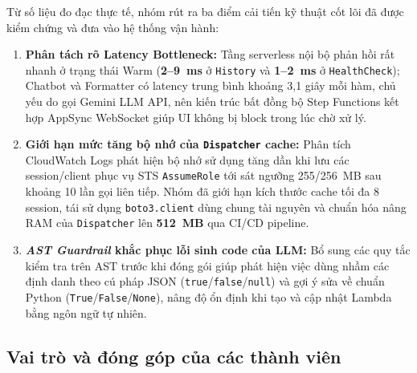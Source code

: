 \documentclass[a4paper,12pt]{article}
\newcommand{\code}[1]{\texttt{#1}}
\begin{document}
Từ số liệu đo đạc thực tế, nhóm rút ra ba điểm cải tiến kỹ thuật cốt lõi đã được kiểm chứng và đưa vào hệ thống vận hành:
\begin{enumerate}[itemsep=3pt,topsep=2pt]
  \item \textbf{Phân tách rõ Latency Bottleneck:} Tầng serverless nội bộ phản hồi rất nhanh ở trạng thái Warm (\textbf{2--9~ms} ở \code{History} và \textbf{1--2~ms} ở \code{HealthCheck}); Chatbot và Formatter có latency trung bình khoảng 3,1 giây mỗi hàm, chủ yếu do gọi Gemini LLM API, nên kiến trúc bất đồng bộ Step Functions kết hợp AppSync WebSocket giúp UI không bị block trong lúc chờ xử lý.
  \item \textbf{Giới hạn mức tăng bộ nhớ của \code{Dispatcher} cache:} Phân tích CloudWatch Logs phát hiện bộ nhớ sử dụng tăng dần khi lưu các session/client phục vụ STS \code{AssumeRole} tới sát ngưỡng 255/256~MB sau khoảng 10 lần gọi liên tiếp. Nhóm đã giới hạn kích thước cache tối đa 8 session, tái sử dụng \code{boto3.client} dùng chung tài nguyên và chuẩn hóa nâng RAM của \code{Dispatcher} lên \textbf{512~MB} qua CI/CD pipeline.
  \item \textbf{\textit{AST Guardrail} khắc phục lỗi sinh code của LLM:} Bổ sung các quy tắc kiểm tra trên AST trước khi đóng gói giúp phát hiện việc dùng nhầm các định danh theo cú pháp JSON (\code{true}/\code{false}/\code{null}) và gợi ý sửa về chuẩn Python (\code{True}/\code{False}/\code{None}), nâng độ ổn định khi tạo và cập nhật Lambda bằng ngôn ngữ tự nhiên.
\end{enumerate}

\subsection{Vai trò và đóng góp của các thành viên}
\end{document}
